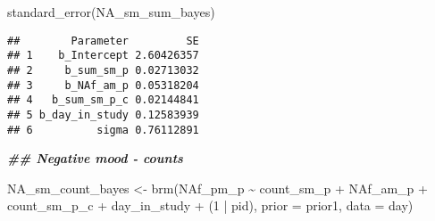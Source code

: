 \documentclass[
]{article}
\newenvironment{Shaded}{\begin{snugshade}}{\end{snugshade}}
\newcommand{\AttributeTok}[1]{\textcolor[rgb]{0.77,0.63,0.00}{#1}}
\newcommand{\DecValTok}[1]{\textcolor[rgb]{0.00,0.00,0.81}{#1}}
\newcommand{\DocumentationTok}[1]{\textcolor[rgb]{0.56,0.35,0.01}{\textbf{\textit{#1}}}}
\newcommand{\FunctionTok}[1]{\textcolor[rgb]{0.00,0.00,0.00}{#1}}
\newcommand{\NormalTok}[1]{#1}
\newcommand{\OtherTok}[1]{\textcolor[rgb]{0.56,0.35,0.01}{#1}}
\newcommand{\SpecialCharTok}[1]{\textcolor[rgb]{0.00,0.00,0.00}{#1}}
\begin{document}
\begin{Shaded}
\begin{Highlighting}[]
\FunctionTok{standard\_error}\NormalTok{(NA\_sm\_sum\_bayes)}
\end{Highlighting}
\end{Shaded}

\begin{verbatim}
##        Parameter         SE
## 1    b_Intercept 2.60426357
## 2     b_sum_sm_p 0.02713032
## 3     b_NAf_am_p 0.05318204
## 4   b_sum_sm_p_c 0.02144841
## 5 b_day_in_study 0.12583939
## 6          sigma 0.76112891
\end{verbatim}

\begin{Shaded}
\begin{Highlighting}[]
\DocumentationTok{\#\# Negative mood {-} counts}

\NormalTok{NA\_sm\_count\_bayes  }\OtherTok{\textless{}{-}} \FunctionTok{brm}\NormalTok{(NAf\_pm\_p }\SpecialCharTok{\textasciitilde{}}\NormalTok{ count\_sm\_p }\SpecialCharTok{+}\NormalTok{ NAf\_am\_p }\SpecialCharTok{+}\NormalTok{ count\_sm\_p\_c }\SpecialCharTok{+}\NormalTok{ day\_in\_study }\SpecialCharTok{+}\NormalTok{ (}\DecValTok{1} \SpecialCharTok{|}\NormalTok{ pid), }\AttributeTok{prior =}\NormalTok{ prior1, }\AttributeTok{data =}\NormalTok{ day)}
\end{Highlighting}
\end{Shaded}
\end{document}
